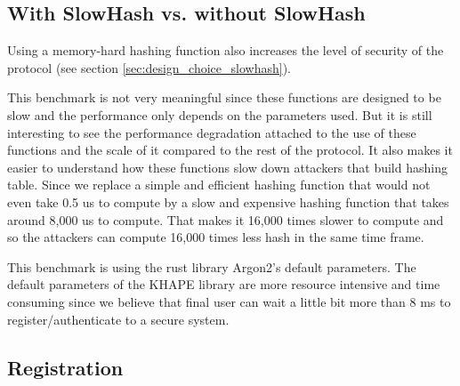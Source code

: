 \documentclass[../report.tex]{subfiles}
\begin{document}
\subsection{With SlowHash vs. without SlowHash} \label{sec:slowhash_performances}%


Using a memory-hard hashing function also increases the level of security of the protocol (see section \ref{sec:design_choice_slowhash}).

This benchmark is not very meaningful since these functions are designed to be slow and the performance only depends on the parameters used. But it is still interesting to see the performance degradation attached to the use of these functions and the scale of it compared to the rest of the protocol.
It also makes it easier to understand how these functions slow down attackers that build hashing table. Since we replace a simple and efficient hashing function that would not even take 0.5 us to compute by a slow and expensive hashing function that takes around 8,000 us to compute. That makes it 16,000 times slower to compute and so the attackers can compute 16,000 times less hash in the same time frame.

This benchmark is using the rust library Argon2's default parameters. The default parameters of the KHAPE library are more resource intensive and time consuming since we believe that final user can wait a little bit more than 8 ms to register/authenticate to a secure system.


\subsection*{Registration}
\end{document}
